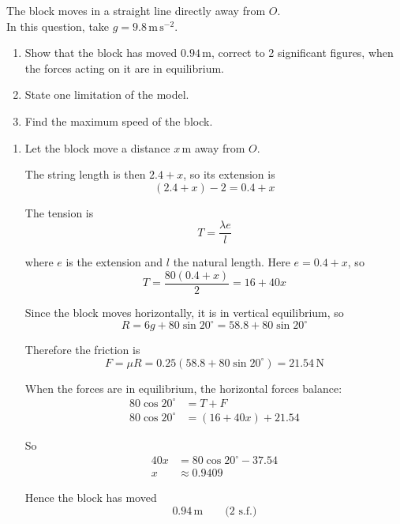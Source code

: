 \documentclass[leqno]{article}
\begin{document}
\begin{enumerate}[
  label=\textbf{\arabic*.},
  leftmargin=*,
  topsep=0pt,
  partopsep=0pt,
  parsep=0pt
]
The block moves in a straight line directly away from $O$. \\
In this question, take $g = 9.8\,\mathrm{m\,s^{-2}}$. \\
\begin{enumerate}[label=\textbf{(\alph*)}]
  \item Show that the block has moved $0.94\,\mathrm{m}$, correct to 2 significant figures, when the forces acting on it are in equilibrium.  \\
  \item State one limitation of the model.  \\
  \item Find the maximum speed of the block.  \\
\end{enumerate}

\vspace*{10pt}

\begin{djsSolution}
\begin{enumerate}[label=\textbf{(\alph*)}, start=1]
  \item Let the block move a distance \(x\,\mathrm{m}\) away from \(O\).

  The string length is then \(2.4+x\), so its extension is
  \[
  (2.4+x)-2=0.4+x
  \]

  The tension is
  \[
  T=\frac{\lambda e}{l}
  \]

  where \(e\) is the extension and \(l\) the natural length. Here \(e=0.4+x\), so
  \[
  T=\frac{80(0.4+x)}{2}=16+40x
  \]

  Since the block moves horizontally, it is in vertical equilibrium, so
  \[
  R=6g+80\sin 20^\circ=58.8+80\sin 20^\circ
  \]

  Therefore the friction is
  \[
  F=\mu R=0.25(58.8+80\sin 20^\circ)=21.54\,\mathrm{N}
  \]

  When the forces are in equilibrium, the horizontal forces balance:
  \begin{align*}
  80\cos 20^\circ &= T+F\\
  80\cos 20^\circ &= (16+40x)+21.54
  \end{align*}

  So
  \begin{align*}
  40x &= 80\cos 20^\circ-37.54\\
  x &\approx 0.9409
  \end{align*}

  Hence the block has moved
  \[
  0.94\,\mathrm{m}\qquad\text{(2 s.f.)}
  \]


\end{enumerate}
\end{djsSolution}
\end{enumerate}
\end{document}
